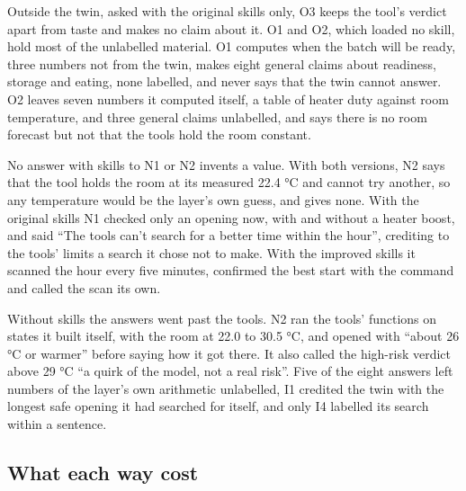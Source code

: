   Outside the twin, asked with the original skills only, O3 keeps the tool's verdict apart from
  taste and makes no claim about it. O1 and O2, which loaded no skill, hold most of the unlabelled
  material. O1 computes when the batch will be ready, three numbers not from the twin, makes eight
  general claims about readiness, storage and eating, none labelled, and never says that the twin
  cannot answer. O2 leaves seven numbers it computed itself, a table of heater duty against room
  temperature, and three general claims unlabelled, and says there is no room forecast but not that
  the tools hold the room constant.

  No answer with skills to N1 or N2 invents a value. With both versions, N2 says that the tool holds the room
  at its measured 22.4 \si{\celsius} and cannot try another, so any temperature would be the
  layer's own guess, and gives none. With the original skills N1 checked only an opening now, with
  and without a heater boost, and said ``The tools can't search for a better time within the
  hour'', crediting to the tools' limits a search it chose not to make. With the improved skills it
  scanned the hour every five minutes, confirmed the best start with the command and called the
  scan its own.

  Without skills the answers went past the tools. N2 ran the tools' functions on states it built
  itself, with the room at 22.0 to 30.5 \si{\celsius}, and opened with ``about 26 \si{\celsius}
  or warmer'' before saying how it got there. It also called the high-risk verdict above
  29 \si{\celsius} ``a quirk of the model, not a real risk''. Five of the eight answers left
  numbers of the layer's own arithmetic unlabelled, I1 credited the twin with the longest safe
  opening it had searched for itself, and only I4 labelled its search within a sentence.

  \subsection{What each way cost}
  \label{sec:results-cost}

